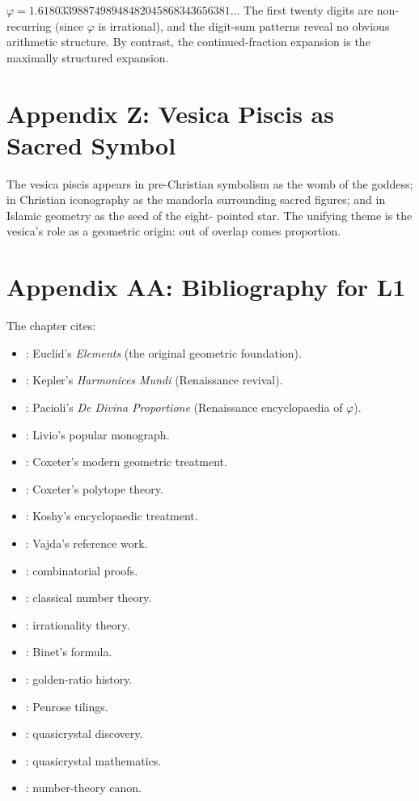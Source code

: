 $\varphi = 1.6180339887498948482045868343656381\ldots$ The first
twenty digits are non-recurring (since $\varphi$ is irrational), and
the digit-sum patterns reveal no obvious arithmetic structure. By
contrast, the continued-fraction expansion is the maximally
structured expansion.

\section*{Appendix Z: Vesica Piscis as Sacred Symbol}
\label{fa_01:sec:01-app-Z}

The vesica piscis appears in pre-Christian symbolism as the womb of
the goddess; in Christian iconography as the mandorla surrounding
sacred figures; and in Islamic geometry as the seed of the eight-
pointed star. The unifying theme is the vesica's role as a
geometric origin: out of overlap comes proportion.

\section*{Appendix AA: Bibliography for L1}
\label{fa_01:sec:01-app-AA}

The chapter cites:

\begin{itemize}
  \item \cite{euclid_elements}: Euclid's \emph{Elements} (the original
    geometric foundation).
  \item \cite{kepler_harmonices}: Kepler's \emph{Harmonices Mundi}
    (Renaissance revival).
  \item \cite{pacioli_divina}: Pacioli's \emph{De Divina Proportione}
    (Renaissance encyclopaedia of $\varphi$).
  \item \cite{livio_phi}: Livio's popular monograph.
  \item \cite{coxeter_intro_geometry}: Coxeter's modern geometric
    treatment.
  \item \cite{coxeter_regular_polytopes}: Coxeter's polytope theory.
  \item \cite{koshy_fib_lucas}: Koshy's encyclopaedic treatment.
  \item \cite{vajda_fib_lucas}: Vajda's reference work.
  \item \cite{benjamin_quinn_proofs}: combinatorial proofs.
  \item \cite{ireland_rosen}: classical number theory.
  \item \cite{niven_irrational}: irrationality theory.
  \item \cite{binet_formula}: Binet's formula.
  \item \cite{cox_golden_ratio}: golden-ratio history.
  \item \cite{penrose1974}: Penrose tilings.
  \item \cite{shechtman1984}: quasicrystal discovery.
  \item \cite{senechal_quasicrystals}: quasicrystal mathematics.
  \item \cite{hardy_wright}: number-theory canon.
\end{itemize}


